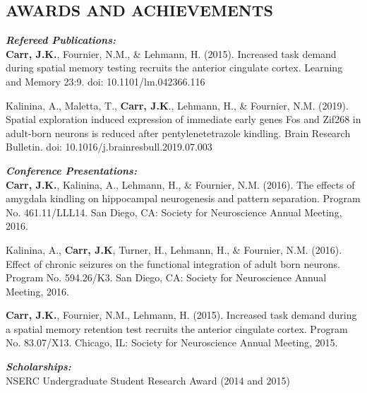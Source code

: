 \documentclass[10pt]{res} %
\begin{document}
\begin{resume}
\section{AWARDS AND ACHIEVEMENTS}

\vspace{5mm}


{\sl \textbf{Refereed Publications:}}\\
\textbf{Carr, J.K.}, Fournier, N.M., \& Lehmann, H. (2015). Increased task demand during spatial memory testing recruits the anterior cingulate cortex. Learning and Memory 23:9. doi:  10.1101/lm.042366.116


Kalinina, A., Maletta, T., \textbf{Carr, J.K}., Lehmann, H., \& Fournier, N.M. (2019). Spatial exploration induced expression of immediate early genes Fos and Zif268 in adult-born neurons is reduced after pentylenetetrazole kindling. Brain Research Bulletin. doi: 10.1016/j.brainresbull.2019.07.003

\vspace{5mm}
{\sl \textbf{Conference Presentations:}}\\
\textbf{Carr, J.K.}, Kalinina, A., Lehmann, H., \& Fournier, N.M. (2016). The effects of amygdala kindling on hippocampal neurogenesis and pattern separation. Program No. 461.11/LLL14. San Diego, CA: Society for Neuroscience Annual Meeting, 2016.

Kalinina, A., \textbf{Carr, J.K}, Turner, H., Lehmann, H., \& Fournier, N.M. (2016). Effect of chronic seizures on the functional integration of adult born neurons. Program No. 594.26/K3. San Diego, CA: Society for Neuroscience Annual Meeting, 2016.

\textbf{Carr, J.K.}, Fournier, N.M., Lehmann, H. (2015). Increased task demand during a spatial memory retention test recruits the anterior cingulate cortex. Program No. 83.07/X13. Chicago, IL: Society for Neuroscience Annual Meeting, 2015.

\vspace{5mm}

{\sl \textbf{Scholarships:}}\\
NSERC Undergraduate Student Research Award (2014 and 2015)


\end{resume}
\end{document}
